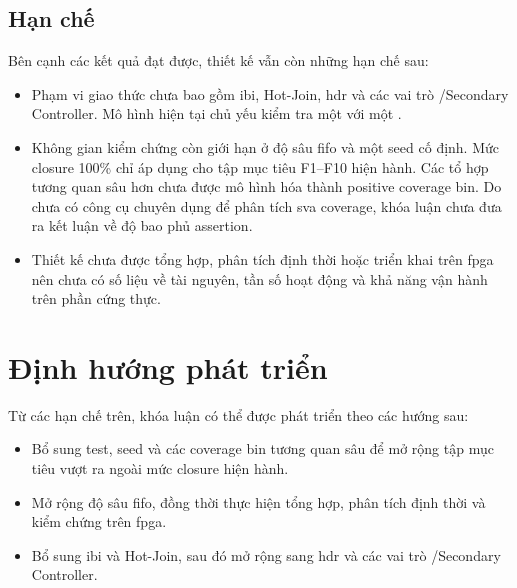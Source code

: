 \subsection{Hạn chế}

Bên cạnh các kết quả đạt được, thiết kế vẫn còn những hạn chế sau:

\begin{itemize}
	\item Phạm vi giao thức chưa bao gồm \gls{ibi}, Hot-Join, \gls{hdr} và các vai trò
	      \Target{}/Secondary Controller. Mô hình hiện tại chủ yếu kiểm tra một \Controller{}
	      với một \Target{}.

	\item Không gian kiểm chứng còn giới hạn ở độ sâu \gls{fifo} \TestbenchQueueDepth{} và một seed cố định.
	      Mức closure 100\% chỉ áp dụng cho tập mục tiêu F1--F10 hiện hành. Các tổ hợp tương quan sâu
	      hơn chưa được mô hình hóa thành positive coverage bin. Do chưa có công cụ chuyên dụng để phân tích
	      \gls{sva} coverage, khóa luận chưa đưa ra kết luận về độ bao phủ assertion.

	\item Thiết kế chưa được tổng hợp, phân tích định thời hoặc triển khai trên \gls{fpga} nên chưa có
	      số liệu về tài nguyên, tần số hoạt động và khả năng vận hành trên phần cứng thực.
\end{itemize}

\section{Định hướng phát triển}

Từ các hạn chế trên, khóa luận có thể được phát triển theo các hướng sau:

\begin{itemize}
	\item Bổ sung test, seed và các coverage bin tương quan sâu để mở rộng tập mục tiêu
	      vượt ra ngoài mức closure hiện hành.

	\item Mở rộng độ sâu \gls{fifo}, đồng thời thực hiện tổng hợp, phân tích định thời và
	      kiểm chứng trên \gls{fpga}.

	\item Bổ sung \gls{ibi} và Hot-Join, sau đó mở rộng sang \gls{hdr} và các vai trò
	      \Target{}/Secondary Controller.
\end{itemize}
